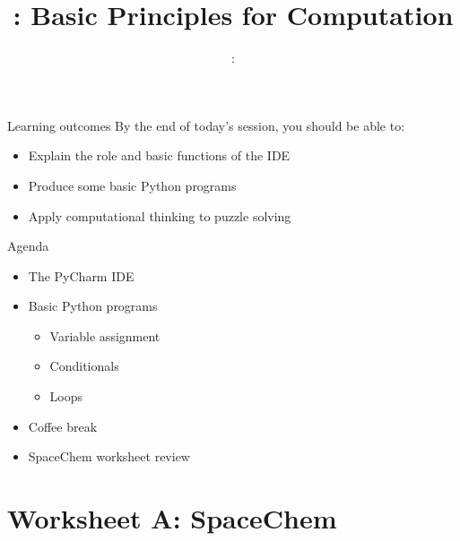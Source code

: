 \usepackage{../../beamerthemeFalmouthGamesAcademy}
\usepackage{multimedia}
\graphicspath{ {../../} }

\lstset{language=Python
}

\usepackage[normalem]{ulem}
\usepackage{wasysym}

\usepackage{pdfpages}

\usetikzlibrary{arrows,automata}




\title{\sessionnumber: Basic Principles for Computation}
\subtitle{\modulecode: \moduletitle}

\frame{\titlepage} 

\begin{frame}{Learning outcomes}
	By the end of today's session, you should be able to:
	\begin{itemize}
		\item Explain the role and basic functions of the IDE
		\item Produce some basic Python programs
		\item Apply computational thinking to puzzle solving
	\end{itemize}
\end{frame}

\begin{frame}{Agenda}
	\begin{itemize}
		\item The PyCharm IDE
		\item Basic Python programs
			\begin{itemize}
				\item Variable assignment
				\item Conditionals
				\item Loops
			\end{itemize}
		\item Coffee break
		\item SpaceChem worksheet review
	\end{itemize}
\end{frame}





\part{Worksheet A: SpaceChem}
\frame{\partpage}



